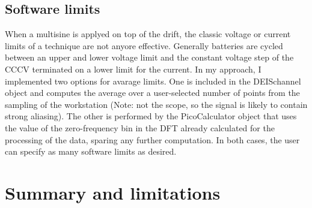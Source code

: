 \subsection{Software limits}

When a multisine is applyed on top of the drift, the classic voltage or current limits of a technique are not anyore effective. 
Generally batteries are cycled between an upper and lower voltage limit and the constant voltage step of the CCCV terminated on a lower limit for the current.  
In my approach, I implemented two options for avarage limits. 
One is included in the DEISchannel object and computes the average over a user-selected number of points from the sampling of the workstation (Note: not the scope, so the signal is likely to contain strong aliasing). 
The other is performed by the PicoCalculator object that uses the value of the zero-frequency bin in the DFT already calculated for the processing of the data, sparing any further computation. In both cases, the user can specify as many software limits as desired.

\section{Summary and limitations}
